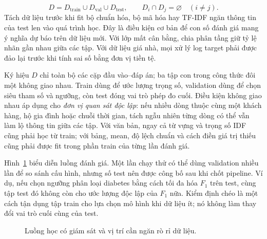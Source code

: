 \documentclass[12pt,a4paper]{report}
\begin{document}
\begin{equation}D=D_{\mathrm{train}}\cup D_{\mathrm{val}}\cup D_{\mathrm{test}},\qquad D_i\cap D_j=\varnothing\quad(i\ne j).\end{equation}
Tách dữ liệu trước khi fit bộ chuẩn hóa, bộ mã hóa hay TF-IDF ngăn thông tin của test len vào quá trình học. Đây là điều kiện cơ bản để con số đánh giá mang ý nghĩa dự báo trên dữ liệu mới. Với lớp mất cân bằng, chia phân tầng giữ tỷ lệ nhãn gần nhau giữa các tập. Với dữ liệu giá nhà, mọi xử lý log target phải được đảo lại trước khi tính sai số bằng đơn vị tiền tệ.

Ký hiệu $D$ chỉ toàn bộ các cặp đầu vào--đáp án; ba tập con trong công thức đôi một không giao nhau. Train dùng để ước lượng trọng số, validation dùng để chọn siêu tham số và ngưỡng, còn test đóng vai trò phép đo cuối. Điều kiện không giao nhau áp dụng cho \emph{đơn vị quan sát độc lập}: nếu nhiều dòng thuộc cùng một khách hàng, hộ gia đình hoặc chuỗi thời gian, tách ngẫu nhiên từng dòng có thể vẫn làm lộ thông tin giữa các tập. Với văn bản, ngay cả từ vựng và trọng số IDF cũng phải học từ train; với bảng, mean, độ lệch chuẩn và cách điền giá trị thiếu cũng phải được fit trong phần train của từng lần đánh giá.

Hình~\ref{fig:essay03-ml-pipeline} biểu diễn luồng đánh giá. Một lần chạy thử có thể dùng validation nhiều lần để so sánh cấu hình, nhưng số test nên được công bố sau khi chốt pipeline. Ví dụ, nếu chọn ngưỡng phân loại diabetes bằng cách tối đa hóa $F_1$ trên test, cùng tập test đó không còn cho ước lượng độc lập của $F_1$ nữa. Kiểm định chéo là một cách tận dụng tập train cho lựa chọn mô hình khi dữ liệu ít; nó không làm thay đổi vai trò cuối cùng của test.
\begin{figure}[htbp]\centering
{}
\caption{Luồng học có giám sát và vị trí cần ngăn rò rỉ dữ liệu.}\label{fig:essay03-ml-pipeline}
\end{figure}
\end{document}
